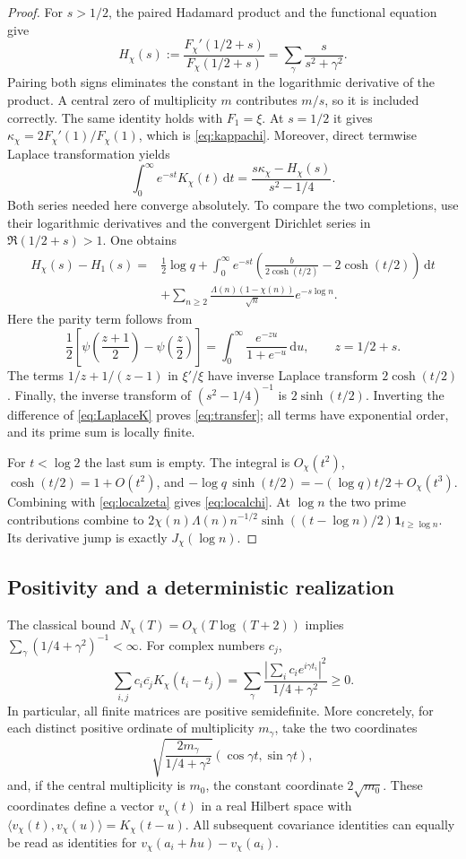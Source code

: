 \documentclass[11pt]{article}
\theoremstyle{definition}
\newcommand{\dd}{\,\mathrm d}
\newcommand{\kap}{\kappa}
\begin{document}
\begin{proof}
For $s>1/2$, the paired Hadamard product and the functional equation give
\[
 H_\chi(s):=\frac{F_\chi'(1/2+s)}{F_\chi(1/2+s)}
       =\sum_\gamma\frac{s}{s^2+\gamma^2}.
\]
Pairing both signs eliminates the constant in the logarithmic derivative of
the product. A central zero of multiplicity $m$ contributes $m/s$, so it is
included correctly. The same identity holds with $F_1=\xi$.
At $s=1/2$ it gives $\kap_\chi=2F_\chi'(1)/F_\chi(1)$, which is
\cref{eq:kappachi}. Moreover, direct termwise Laplace transformation yields
\begin{equation}\label{eq:LaplaceK}
 \int_0^\infty e^{-st}K_\chi(t)\dd t
   =\frac{s\kap_\chi-H_\chi(s)}{s^2-1/4}.
\end{equation}
Both series needed here converge absolutely. To compare the two completions,
use their logarithmic derivatives and the convergent Dirichlet series in
$\Re(1/2+s)>1$. One obtains
\begin{align*}
 H_\chi(s)-H_1(s)
 ={}&\frac12\log q
 +\int_0^\infty e^{-st}
       \left(\frac{b}{2\cosh(t/2)}-2\cosh(t/2)\right)\dd t\\
 &+\sum_{n\ge2}\frac{\Lambda(n)(1-\chi(n))}{\sqrt n}e^{-s\log n}.
\end{align*}
Here the parity term follows from
\[
 \frac12\left[\psi\left(\frac{z+1}2\right)-\psi\left(\frac z2\right)\right]
 =\int_0^\infty\frac{e^{-zu}}{1+e^{-u}}\dd u,
 \qquad z=1/2+s.
\]
The terms $1/z+1/(z-1)$ in $\xi'/\xi$ have inverse Laplace transform
$2\cosh(t/2)$. Finally, the inverse transform of $(s^2-1/4)^{-1}$ is
$2\sinh(t/2)$. Inverting the difference of \cref{eq:LaplaceK} proves
\cref{eq:transfer}; all terms have exponential order, and its prime sum is
locally finite.

For $t<\log2$ the last sum is empty. The integral is $O_\chi(t^2)$,
$\cosh(t/2)=1+O(t^2)$, and
$-\log q\,\sinh(t/2)=-(\log q)t/2+O_\chi(t^3)$.
Combining with \cref{eq:localzeta} gives \cref{eq:localchi}.
At $\log n$ the two prime contributions combine to
$2\chi(n)\Lambda(n)n^{-1/2}\sinh((t-\log n)/2)\mathbf1_{t\ge\log n}$.
Its derivative jump is exactly $J_\chi(\log n)$.
\end{proof}

\subsection{Positivity and a deterministic realization}

The classical bound $N_\chi(T)=O_\chi(T\log(T+2))$ implies
$\sum_\gamma(1/4+\gamma^2)^{-1}<\infty$. For complex numbers $c_j$,
\[
 \sum_{i,j}c_i\overline{c_j}K_\chi(t_i-t_j)
 =\sum_\gamma\frac{|\sum_i c_i e^{i\gamma t_i}|^2}{1/4+\gamma^2}\ge0.
\]
In particular, all finite matrices are positive semidefinite. More concretely,
for each distinct positive ordinate of multiplicity $m_\gamma$, take the two
coordinates
\[
 \sqrt{\frac{2m_\gamma}{1/4+\gamma^2}}
       (\cos\gamma t,\sin\gamma t),
\]
and, if the central multiplicity is $m_0$, the constant coordinate $2\sqrt{m_0}$.
These coordinates define a vector $v_\chi(t)$ in a real Hilbert space with
$\langle v_\chi(t),v_\chi(u)\rangle=K_\chi(t-u)$.
All subsequent covariance identities can equally be read as identities for
$v_\chi(a_i+hu)-v_\chi(a_i)$.
\end{document}
